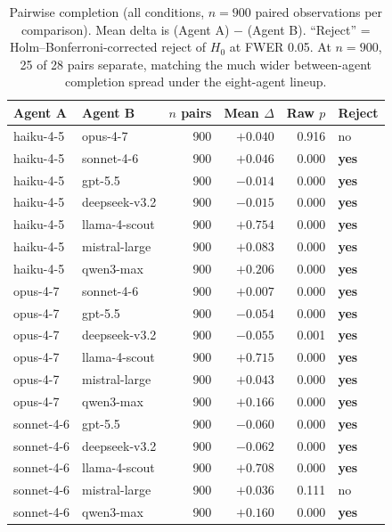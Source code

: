 \begin{table}[t]
\centering
\caption{Pairwise completion (all conditions, $n=900$ paired
observations per comparison). Mean delta is (Agent A) $-$ (Agent B).
``Reject'' = Holm--Bonferroni-corrected reject of $H_0$ at FWER 0.05.
At $n=900$, 25 of 28 pairs separate, matching the much wider
between-agent completion spread under the eight-agent lineup.}
\label{tab:pairwise-completion}
\small
\begin{tabular}{llrrrl}
\toprule
Agent A & Agent B & $n$ pairs & Mean $\Delta$ & Raw $p$ & Reject \\
\midrule
haiku-4-5      & opus-4-7       & 900 & $+0.040$ & 0.916 & no \\
haiku-4-5      & sonnet-4-6     & 900 & $+0.046$ & 0.000 & \textbf{yes} \\
haiku-4-5      & gpt-5.5        & 900 & $-0.014$ & 0.000 & \textbf{yes} \\
haiku-4-5      & deepseek-v3.2  & 900 & $-0.015$ & 0.000 & \textbf{yes} \\
haiku-4-5      & llama-4-scout  & 900 & $+0.754$ & 0.000 & \textbf{yes} \\
haiku-4-5      & mistral-large  & 900 & $+0.083$ & 0.000 & \textbf{yes} \\
haiku-4-5      & qwen3-max      & 900 & $+0.206$ & 0.000 & \textbf{yes} \\
opus-4-7       & sonnet-4-6     & 900 & $+0.007$ & 0.000 & \textbf{yes} \\
opus-4-7       & gpt-5.5        & 900 & $-0.054$ & 0.000 & \textbf{yes} \\
opus-4-7       & deepseek-v3.2  & 900 & $-0.055$ & 0.001 & \textbf{yes} \\
opus-4-7       & llama-4-scout  & 900 & $+0.715$ & 0.000 & \textbf{yes} \\
opus-4-7       & mistral-large  & 900 & $+0.043$ & 0.000 & \textbf{yes} \\
opus-4-7       & qwen3-max      & 900 & $+0.166$ & 0.000 & \textbf{yes} \\
sonnet-4-6     & gpt-5.5        & 900 & $-0.060$ & 0.000 & \textbf{yes} \\
sonnet-4-6     & deepseek-v3.2  & 900 & $-0.062$ & 0.000 & \textbf{yes} \\
sonnet-4-6     & llama-4-scout  & 900 & $+0.708$ & 0.000 & \textbf{yes} \\
sonnet-4-6     & mistral-large  & 900 & $+0.036$ & 0.111 & no \\
sonnet-4-6     & qwen3-max      & 900 & $+0.160$ & 0.000 & \textbf{yes} \\

\end{tabular}
\end{table}
